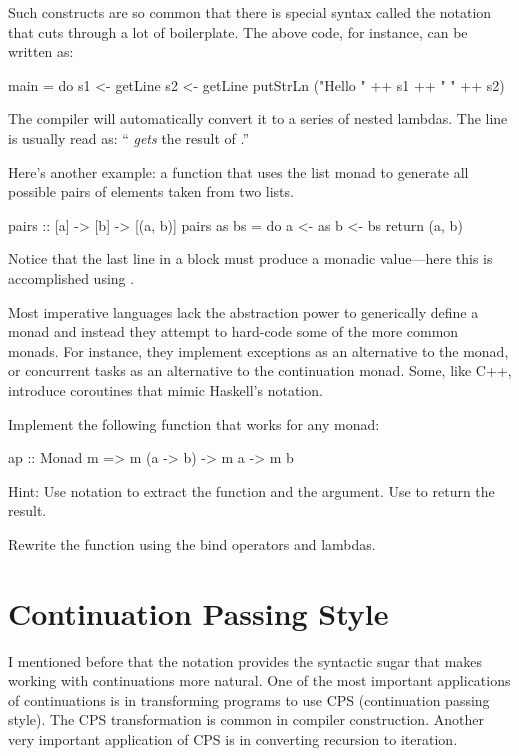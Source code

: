 \documentclass[DaoFP]{subfiles}
\begin{document}
Such constructs are so common that there is special syntax called the  notation that cuts through a lot of boilerplate. The above code, for instance, can be written as:
\begin{haskell}
main = do
  s1 <- getLine
  s2 <- getLine
  putStrLn ("Hello " ++ s1 ++ " " ++ s2)
\end{haskell}
The compiler will automatically convert it to a series of nested lambdas. The line  is usually read as: `` \emph{gets} the result of .''

Here's another example: a function that uses the list monad to generate all possible pairs of elements taken from two lists.
\begin{haskell}
pairs :: [a] -> [b] -> [(a, b)]
pairs as bs = do
  a <- as
  b <- bs
  return (a, b)
\end{haskell}
Notice that the last line in a  block must produce a monadic value---here this is accomplished using .

Most imperative languages lack the abstraction power to generically define a monad and instead they attempt to hard-code some of the more common monads. For instance, they implement exceptions as an alternative to the  monad, or concurrent tasks as an alternative to the continuation monad. Some, like C++, introduce coroutines that mimic Haskell's  notation. 

\begin{exercise}
Implement the following function that works for any monad:
\begin{haskell}
ap :: Monad m => m (a -> b) -> m a -> m b
\end{haskell}
Hint: Use  notation to extract the function and the argument. Use  to return the result.
\end{exercise}

\begin{exercise}
Rewrite the  function using the bind operators and lambdas.
\end{exercise}

\section{Continuation Passing Style}

I mentioned before that the  notation provides the syntactic sugar that makes working with continuations more natural. One of the most important applications of continuations is in transforming programs to use CPS (continuation passing style). The CPS transformation is common in compiler construction. Another very important application of CPS is in converting recursion to iteration. 
\end{document}

